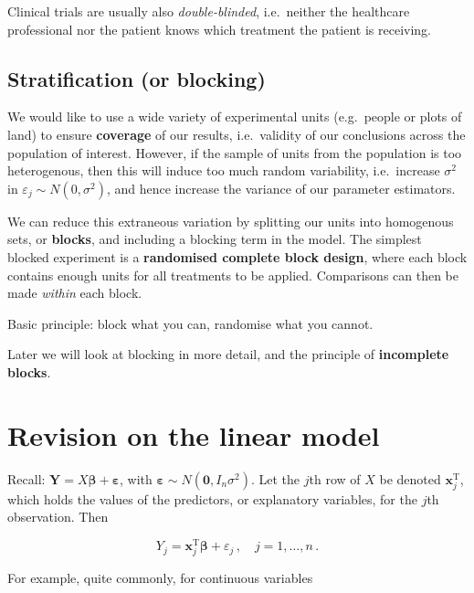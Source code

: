 \documentclass[
]{book}
\theoremstyle{definition}
\theoremstyle{definition}
\theoremstyle{definition}
\theoremstyle{definition}
\theoremstyle{remark}
\begin{document}
Clinical trials are usually also \emph{double-blinded}, i.e.~neither the healthcare professional nor the patient knows which treatment the patient is receiving.

\hypertarget{intro-blocking}{%
\subsection{Stratification (or blocking)}\label{intro-blocking}}

We would like to use a wide variety of experimental units (e.g.~people or plots of land) to ensure \textbf{coverage} of our results, i.e.~validity of our conclusions across the population of interest. However, if the sample of units from the population is too heterogenous, then this will induce too much random variability, i.e.~increase \(\sigma^{2}\) in \(\varepsilon_{j}\sim N(0,\sigma^{2})\), and hence increase the variance of our parameter estimators.

We can reduce this extraneous variation by splitting our units into homogenous sets, or \textbf{blocks}, and including a blocking term in the model. The simplest blocked experiment is a \textbf{randomised complete block design}, where each block contains enough units for all treatments to be applied. Comparisons can then be made \emph{within} each block.

Basic principle: block what you can, randomise what you cannot.

Later we will look at blocking in more detail, and the principle of \textbf{incomplete blocks}.

\hypertarget{lin-model-rev}{%
\section{Revision on the linear model}\label{lin-model-rev}}

Recall: \(\boldsymbol{Y}=X\boldsymbol{\beta}+\boldsymbol{\varepsilon}\), with \(\boldsymbol{\varepsilon}\sim N(\boldsymbol{0},I_n\sigma^{2})\). Let the \(j\)th row of \(X\) be denoted \(\boldsymbol{x}^\textrm{T}_j\), which holds the values of the predictors, or explanatory variables, for the \(j\)th observation. Then

\begin{equation*}
Y_j=\boldsymbol{x}_j^{\textrm{T}}\boldsymbol{\beta}+\varepsilon_j\,,\quad j=1,\ldots,n\,.
\end{equation*}

For example, quite commonly, for continuous variables
\end{document}
